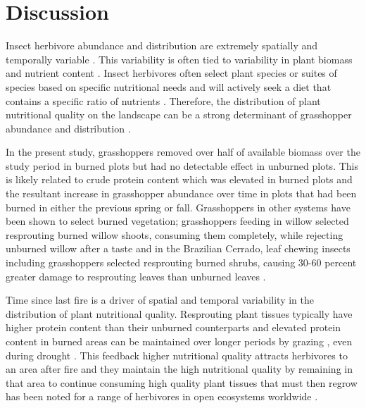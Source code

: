 \documentclass[referee, 
	            sn-basic]
           {sn-jnl}
\begin{document}
\section{Discussion}

Insect herbivore abundance and distribution are extremely spatially and temporally variable \citep{cappuccino1995}. This variability is often tied to variability in plant biomass and nutrient content \citep{joern2012}. Insect herbivores often select plant species or suites of species based on specific nutritional needs \citep{ibanez2013, behmer2008} and will actively seek a diet that contains a specific ratio of nutrients \citep{behmer2009}. Therefore, the distribution of plant nutritional quality on the landscape can be a strong determinant of grasshopper abundance and distribution \citep{white2012}. 

In the present study, grasshoppers removed over half of available biomass over the study period in burned plots but had no detectable effect in unburned plots. This is likely related to crude protein content which was elevated in burned plots and the resultant increase in grasshopper abundance over time in plots that had been burned in either the previous spring or fall. Grasshoppers in other systems have been shown to select burned vegetation; grasshoppers feeding in willow selected resprouting burned willow shoots, consuming them completely, while rejecting unburned willow after a taste \citep{stein1992} and in the Brazilian Cerrado, leaf chewing insects including grasshoppers selected resprouting burned shrubs, causing 30-60 percent greater damage to resprouting leaves than unburned leaves \citep{lopes2011}. 

Time since last fire is a driver of spatial and temporal variability in the distribution of plant nutritional quality. Resprouting plant tissues typically have higher protein content than their unburned counterparts \citep{mcgranahan2021} and elevated protein content in burned areas can be maintained over longer periods by grazing \citep{wanchuk2021}, even during drought \citep{spiess2020}. This feedback \textemdash higher nutritional quality attracts herbivores to an area after fire and they maintain the high nutritional quality by remaining in that area to continue consuming high quality plant tissues that must then regrow \textemdash has been noted for a range of herbivores in open ecosystems worldwide \citep{allred2011, archibald2005, sensenig2010}. 
\end{document}
